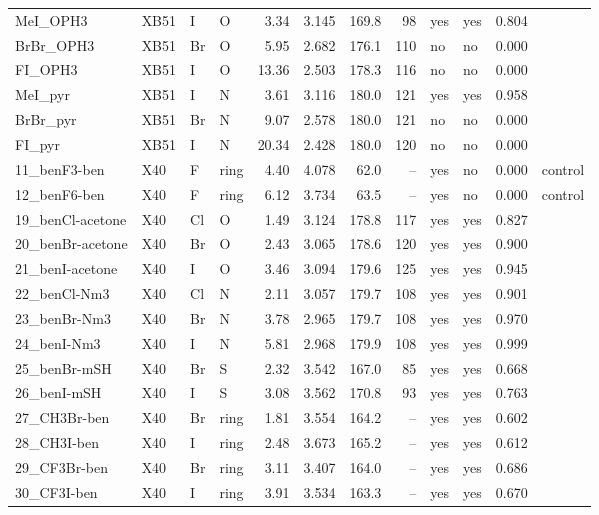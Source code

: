 \documentclass[journal=jcisd8,manuscript=suppinfo]{achemso}
\begin{document}
\begin{singlespace}
{\begin{longtable}{llllrrrrllrl}
MeI\_OPH3 & XB51 & I & O & 3.34 & 3.145 & 169.8 & 98 & yes & yes & 0.804 & \\
BrBr\_OPH3 & XB51 & Br & O & 5.95 & 2.682 & 176.1 & 110 & no & no & 0.000 & \\
FI\_OPH3 & XB51 & I & O & 13.36 & 2.503 & 178.3 & 116 & no & no & 0.000 & \\
MeI\_pyr & XB51 & I & N & 3.61 & 3.116 & 180.0 & 121 & yes & yes & 0.958 & \\
BrBr\_pyr & XB51 & Br & N & 9.07 & 2.578 & 180.0 & 121 & no & no & 0.000 & \\
FI\_pyr & XB51 & I & N & 20.34 & 2.428 & 180.0 & 120 & no & no & 0.000 & \\
11\_benF3-ben & X40 & F & ring & 4.40 & 4.078 & 62.0 & -- & yes & no & 0.000 & control\\
12\_benF6-ben & X40 & F & ring & 6.12 & 3.734 & 63.5 & -- & yes & no & 0.000 & control\\
19\_benCl-acetone & X40 & Cl & O & 1.49 & 3.124 & 178.8 & 117 & yes & yes & 0.827 & \\
20\_benBr-acetone & X40 & Br & O & 2.43 & 3.065 & 178.6 & 120 & yes & yes & 0.900 & \\
21\_benI-acetone & X40 & I & O & 3.46 & 3.094 & 179.6 & 125 & yes & yes & 0.945 & \\
22\_benCl-Nm3 & X40 & Cl & N & 2.11 & 3.057 & 179.7 & 108 & yes & yes & 0.901 & \\
23\_benBr-Nm3 & X40 & Br & N & 3.78 & 2.965 & 179.7 & 108 & yes & yes & 0.970 & \\
24\_benI-Nm3 & X40 & I & N & 5.81 & 2.968 & 179.9 & 108 & yes & yes & 0.999 & \\
25\_benBr-mSH & X40 & Br & S & 2.32 & 3.542 & 167.0 & 85 & yes & yes & 0.668 & \\
26\_benI-mSH & X40 & I & S & 3.08 & 3.562 & 170.8 & 93 & yes & yes & 0.763 & \\
27\_CH3Br-ben & X40 & Br & ring & 1.81 & 3.554 & 164.2 & -- & yes & yes & 0.602 & \\
28\_CH3I-ben & X40 & I & ring & 2.48 & 3.673 & 165.2 & -- & yes & yes & 0.612 & \\
29\_CF3Br-ben & X40 & Br & ring & 3.11 & 3.407 & 164.0 & -- & yes & yes & 0.686 & \\
30\_CF3I-ben & X40 & I & ring & 3.91 & 3.534 & 163.3 & -- & yes & yes & 0.670 & \\
\end{longtable}}

\end{singlespace}
\end{document}
